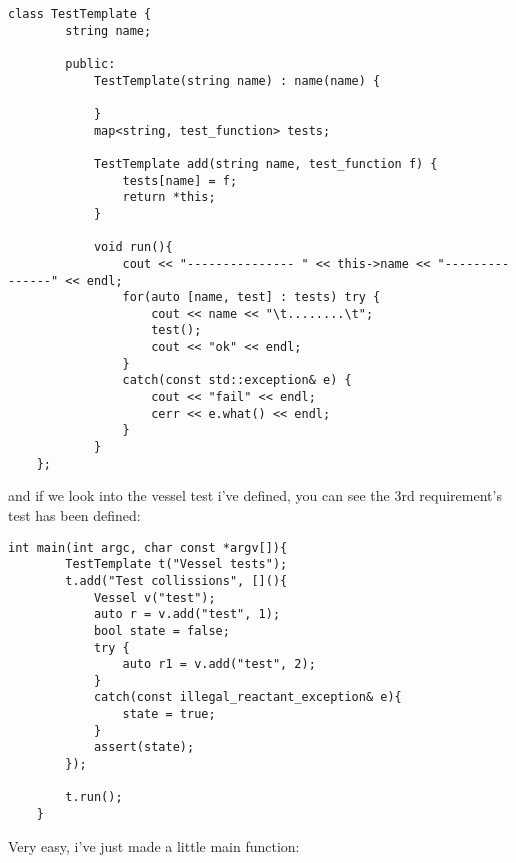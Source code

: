 \begin{lstlisting}[style=colorC++]
    class TestTemplate {
        string name;
    
        public:
            TestTemplate(string name) : name(name) {
    
            }
            map<string, test_function> tests;
    
            TestTemplate add(string name, test_function f) {
                tests[name] = f;
                return *this;
            }
    
            void run(){
                cout << "--------------- " << this->name << "---------------" << endl;
                for(auto [name, test] : tests) try {
                    cout << name << "\t........\t";
                    test();
                    cout << "ok" << endl;
                }
                catch(const std::exception& e) {
                    cout << "fail" << endl;
                    cerr << e.what() << endl;
                }
            }
    };
\end{lstlisting}

and if we look into the vessel test i've defined, you can see the 3rd requirement's test has been defined:

\begin{lstlisting}[style=colorC++]
    int main(int argc, char const *argv[]){
        TestTemplate t("Vessel tests");
        t.add("Test collissions", [](){
            Vessel v("test");
            auto r = v.add("test", 1);
            bool state = false;
            try {
                auto r1 = v.add("test", 2);
            }
            catch(const illegal_reactant_exception& e){
                state = true;
            }
            assert(state);
        });

        t.run();
    }
\end{lstlisting}


Very easy, i've just made a little main function:

